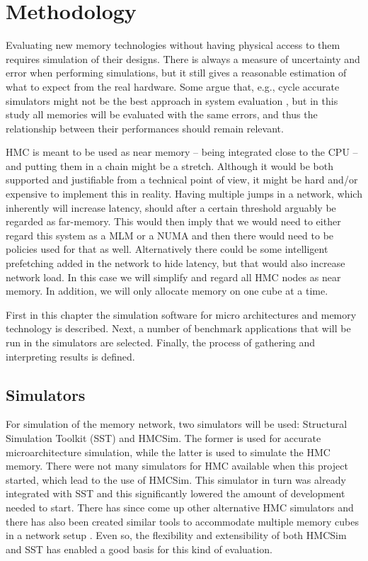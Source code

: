 \chapter{Methodology} \label{method}
Evaluating new memory technologies without having physical access to them requires simulation of their designs. There is always a measure of uncertainty and error when performing simulations, but it still gives a reasonable estimation of what to expect from the real hardware. Some argue that, e.g., cycle accurate simulators might not be the best approach in system evaluation \cite{weaver2008cycle}, but in this study all memories will be evaluated with the same errors, and thus the relationship between their performances should remain relevant. 
\bigskip

HMC is meant to be used as near memory -- being integrated close to the CPU -- and putting them in a chain might be a stretch. Although it would be both supported and justifiable from a technical point of view, it might be hard and/or expensive to implement this in reality. Having multiple jumps in a network, which inherently will increase latency, should after a certain threshold arguably be regarded as far-memory. This would then imply that we would need to either regard this system as a MLM or a NUMA and then there would need to be policies used for that as well. Alternatively there could be some intelligent prefetching added in the network to hide latency, but that would also increase network load. In this case we will simplify and regard all HMC nodes as near memory. In addition, we will only allocate memory on one cube at a time.
\bigskip

First in this chapter the simulation software for micro architectures and memory technology is described. Next, a number of benchmark applications that will be run in the simulators are selected. Finally, the process of gathering and interpreting results is defined.


\section{Simulators}
For simulation of the memory network, two simulators will be used: Structural Simulation Toolkit (SST) and HMCSim. The former is used for accurate microarchitecture simulation, while the latter is used to simulate the HMC memory. There were not many simulators for HMC available when this project started, which lead to the use of HMCSim. This simulator in turn was already integrated with SST and this significantly lowered the amount of development needed to start. There has since come up other alternative HMC simulators \cite{7544479} \cite{Yang:2018:HCH:3240302.3240319} and there has also been created similar tools to accommodate multiple memory cubes in a network setup \cite{Siegl:2017:BAF:3132402.3132403}. Even so, the flexibility and extensibility of both HMCSim and SST has enabled a good basis for this kind of evaluation.
\bigskip

